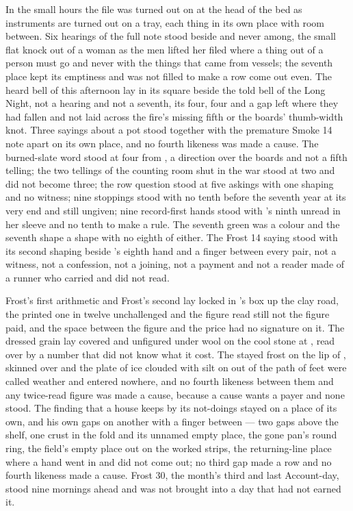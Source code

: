 In the small hours the file was turned out on  at the head of the bed as instruments are turned out on a tray, each thing in its own place with room between. Six hearings of the full note stood beside and never among, the small flat knock out of a woman as the men lifted her filed where a thing out of a person must go and never with the things that came from vessels; the seventh place kept its emptiness and was not filled to make a row come out even. The heard bell of this afternoon lay in its square beside the told bell of the Long Night, not a hearing and not a seventh, its four, four and a gap left where they had fallen and not laid across the fire's missing fifth or the boards' thumb-width knot. Three sayings about a pot stood together with the premature Smoke 14 note apart on its own place, and no fourth likeness was made a cause. The burned-slate word stood at four from , a direction over the boards and not a fifth telling; the two tellings of the counting room shut in the war stood at two and did not become three; the row question stood at five askings with one shaping and no witness; nine stoppings stood with no tenth before the seventh year at its very end and still ungiven; nine record-first hands stood with 's ninth unread in her sleeve and no tenth to make a rule. The seventh green was a colour and the seventh shape a shape with no eighth of either. The Frost 14 saying stood with its second shaping beside 's eighth hand and a finger between every pair, not a witness, not a confession, not a joining, not a payment and not a reader made of a runner who carried and did not read.

Frost's first arithmetic and Frost's second lay locked in 's box up the clay road, the printed one in twelve unchallenged and the figure read still not the figure paid, and the space between the figure and the price had no signature on it. The dressed grain lay covered and unfigured under wool on the cool stone at , read over by a number that did not know what it cost. The stayed frost on the lip of ,  skinned over and the plate of ice clouded with silt on  out of the path of feet were called weather and entered nowhere, and no fourth likeness between them and any twice-read figure was made a cause, because a cause wants a payer and none stood. The finding that a house keeps by its not-doings stayed on a place of its own, and his own gaps on another with a finger between --- two gaps above the shelf, one crust in the fold and its unnamed empty place, the gone pan's round ring, the field's empty place out on the worked strips, the returning-line place where a hand went in and did not come out; no third gap made a row and no fourth likeness made a cause. Frost 30, the month's third and last Account-day, stood nine mornings ahead and was not brought into a day that had not earned it.

